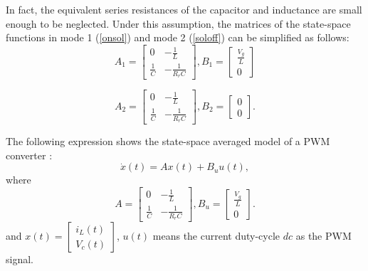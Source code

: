 \documentclass[journal]{IEEEtran}
\begin{document}
In fact, the equivalent series resistances of the capacitor and inductance are small enough to be neglected. Under this assumption, the matrices of the state-space functions in mode 1 (\ref{onsol}) and mode 2 (\ref{soloff}) can be simplified as follows:
\begin{equation}\label{onmat}
{A_1} = \left[ {\begin{array}{*{20}{c}}
	0&{ - \frac{1}{L}}\\
	{\frac{1}{C}}&{ - \frac{1}{{R_r C}}}
	\end{array}} \right],{B_1} = \left[ {\begin{array}{*{20}{c}}
	{\frac{V_g}{L}}\\
	0
	\end{array}} \right]
\end{equation}

\begin{equation}\label{offmat}
{A_2} = \left[ {\begin{array}{*{20}{c}}
	0&{ - \frac{1}{L}}\\
	{\frac{1}{C}}&{ - \frac{1}{{R_r C}}}
	\end{array}} \right],{B_2} = \left[ {\begin{array}{*{20}{c}}
	0\\
	0
	\end{array}} \right].
\end{equation}

The following expression shows the state-space averaged model of a PWM converter \cite{leyva2006passivity}:
\begin{equation}\label{modelpwm}
\dot { x}(t) = A x(t) + {B_u} u(t),
\end{equation}
where
\begin{equation}\label{modelpara}
A = \left[ {\begin{array}{*{20}{c}}
	0&{ - \frac{1}{L}}\\
	{\frac{1}{C}}&{ - \frac{1}{{R_r C}}}
	\end{array}} \right],{B_u} = \left[ {\begin{array}{*{20}{c}}
	{\frac{{{V_g}}}{L}}\\
	0
	\end{array}} \right].
\end{equation}
and $x\left( t \right) = \left[ {\begin{array}{*{20}{c}}
	{{i_L}\left( t \right)}\\
	{{V_c}\left( t \right)}
	\end{array}} \right]$, $u(t)$ means the current duty-cycle $dc$ as the PWM signal.
\end{document}
